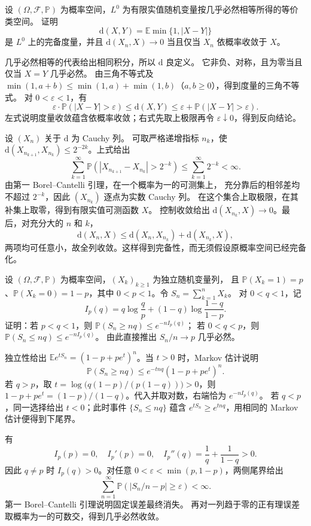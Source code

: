 \begin{optionalexercise}\label{b1:ex:30-probability-metric}
设 \((\Omega,\mathcal F,\mathbb P)\) 为概率空间，\(L^0\) 为有限实值随机变量按几乎必然相等所得的等价类空间。
证明
\[
 \mathrm d(X,Y)=\mathbb E\min\{1,|X-Y|\}
\]
是 \(L^0\) 上的完备度量，并且 \(\mathrm d(X_n,X)\to0\) 当且仅当 \(X_n\) 依概率收敛于 \(X\)。
\end{optionalexercise}
\begin{solution}
几乎必然相等的代表给出相同积分，所以 \(\mathrm d\) 良定义。
它非负、对称，且为零当且仅当 \(X=Y\) 几乎必然。
由三角不等式及
\(\min(1,a+b)\leq\min(1,a)+\min(1,b)\)（\(a,b\geq0\)），得到度量的三角不等式。
对 \(0<\varepsilon<1\)，有
\[
 \varepsilon\cdot\mathbb P(|X-Y|>\varepsilon)
 \leq \mathrm d(X,Y)
 \leq\varepsilon+\mathbb P(|X-Y|>\varepsilon).
\]
左式说明度量收敛蕴含依概率收敛；右式先取上极限再令 \(\varepsilon\downarrow0\)，得到反向结论。

设 \((X_n)\) 关于 \(\mathrm d\) 为 Cauchy 列。
可取严格递增指标 \(n_k\)，使
\(\mathrm d(X_{n_{k+1}},X_{n_k})\leq2^{-2k}\)。上式给出
\[
 \sum_{k=1}^{\infty}\mathbb P(|X_{n_{k+1}}-X_{n_k}|>2^{-k})
 \leq\sum_{k=1}^{\infty}2^{-k}<\infty.
\]
由第一 Borel--Cantelli 引理，在一个概率为一的可测集上，
充分靠后的相邻差均不超过 \(2^{-k}\)，因此 \((X_{n_k})\) 逐点为实数 Cauchy 列。
在这个集合上取极限，在其补集上取零，得到有限实值可测函数 \(X\)。
控制收敛给出 \(\mathrm d(X_{n_k},X)\to0\)。最后，对充分大的 \(n\) 和 \(k\)，
\[
 \mathrm d(X_n,X)\leq \mathrm d(X_n,X_{n_k})+\mathrm d(X_{n_k},X),
\]
两项均可任意小，故全列收敛。这样得到完备性，而无须假设原概率空间已经完备化。
\end{solution}

\begin{optionalexercise}\label{b1:ex:30-bernoulli-exponential-tail}
设 \((\Omega,\mathcal F,\mathbb P)\) 为概率空间，\((X_k)_{k\geq1}\) 为独立随机变量列，
且 \(\mathbb P(X_k=1)=p\)、\(\mathbb P(X_k=0)=1-p\)，其中 \(0<p<1\)。令 \(S_n=\sum_{k=1}^nX_k\)。
对 \(0<q<1\)，记
\[
 I_p(q)=q\log\frac qp+(1-q)\log\frac{1-q}{1-p}.
\]
证明：若 \(p<q<1\)，则 \(\mathbb P(S_n\geq nq)\leq e^{-nI_p(q)}\)；
若 \(0<q<p\)，则 \(\mathbb P(S_n\leq nq)\leq e^{-nI_p(q)}\)。
由此直接推出 \(S_n/n\to p\) 几乎必然。
\end{optionalexercise}
\begin{solution}
独立性给出 \(\mathbb E e^{tS_n}=(1-p+pe^t)^n\)。当 \(t>0\) 时，Markov 估计说明
\[
 \mathbb P(S_n\geq nq)
 \leq e^{-tnq}(1-p+pe^t)^n.
\]
若 \(q>p\)，取
\(t=\log\bigl(q(1-p)/(p(1-q))\bigr)>0\)，则
\(1-p+pe^t=(1-p)/(1-q)\)。代入并取对数，右端恰为 \(e^{-nI_p(q)}\)。
若 \(q<p\)，同一选择给出 \(t<0\)；此时事件 \(\{S_n\leq nq\}\)
蕴含 \(e^{tS_n}\geq e^{tnq}\)，用相同的 Markov 估计便得到下尾界。

有
\[
 I_p(p)=0,\quad I_p'(p)=0,\quad
 I_p''(q)=\frac1q+\frac1{1-q}>0.
\]
因此 \(q\ne p\) 时 \(I_p(q)>0\)。对任意
\(0<\varepsilon<\min(p,1-p)\)，两侧尾界给出
\[
 \sum_{n=1}^{\infty}\mathbb P(|S_n/n-p|\geq\varepsilon)<\infty.
\]
第一 Borel--Cantelli 引理说明固定误差最终消失。
再对一列趋于零的正有理误差取概率为一的可数交，得到几乎必然收敛。
\end{solution}


